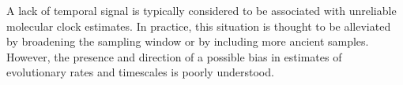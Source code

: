 \documentclass[11pt]{article}
\begin{document}
A lack of temporal signal is typically considered to be associated with unreliable molecular clock estimates. In practice, this situation is thought to be alleviated by broadening the sampling window or by including more ancient samples. However, the presence and direction of a possible bias in estimates of evolutionary rates and timescales is poorly understood. 




\end{document}
